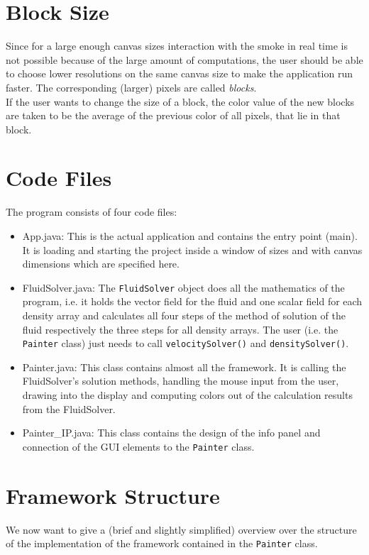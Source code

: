 \documentclass[a4paper,10pt,oneside,final,german,openbib,pdftex,titlepage]{scrbook}
\begin{document}
\section{Block Size}\label{sec:block-size}
Since for a large enough canvas sizes interaction with the smoke in real time is not possible because of the large amount of computations, the user should be able to choose lower resolutions on the same canvas size to make the application run faster. The corresponding (larger) pixels are called \emph{blocks}.\\

If the user wants to change the size of a block, the color value of the new blocks are taken to be the average of the previous color of all pixels, that lie in that block.
\section{Code Files}
The program consists of four code files:
\begin{itemize}
\item App.java: This is the actual application and contains the entry point (main). It is loading and starting the project inside a window of sizes and with canvas dimensions which are specified here.
\item FluidSolver.java: The \texttt{FluidSolver} object does all the mathematics of the program, i.e. it holds the vector field for the fluid and one scalar field for each density array and calculates all four steps of the method of solution of the fluid respectively the three steps for all density arrays. The user (i.e. the \texttt{Painter} class) just needs to call \texttt{velocitySolver()} and \texttt{densitySolver()}.
\item Painter.java: This class contains almost all the framework. It is calling the FluidSolver's solution methods, handling the mouse input from the user, drawing into the display and computing colors out of the calculation results from the FluidSolver.
\item Painter\_IP.java: This class contains the design of the info panel and connection of the GUI elements to the \texttt{Painter} class.
\end{itemize}
\section{Framework Structure}
We now want to give a (brief and slightly simplified) overview over the structure of the implementation of the framework contained in the \texttt{Painter} class.\\
\end{document}
